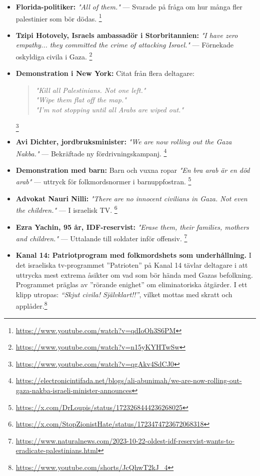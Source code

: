 \documentclass[12pt]{article}
\begin{document}
\begin{itemize}
    \item \textbf{Florida-politiker:} \textit{"All of them."} — Svarade på fråga om hur många fler palestinier som bör dödas. \footnote{\url{https://www.youtube.com/watch?v=qdIoOh3S6PM}}

    \item \textbf{Tzipi Hotovely, Israels ambassadör i Storbritannien:} \textit{"I have zero empathy... they committed the crime of attacking Israel."} — Förnekade oskyldiga civila i Gaza. \footnote{\url{https://www.youtube.com/watch?v=n15yKYHTwSw}}

    \item \textbf{Demonstration i New York:} Citat från flera deltagare:
    \begin{quote}
    \textit{"Kill all Palestinians. Not one left."}\\
    \textit{"Wipe them flat off the map."}\\
    \textit{"I’m not stopping until all Arabs are wiped out."}
    \end{quote}
    \footnote{\url{https://www.youtube.com/watch?v=qgAkv4SdCJ0}}

    \item \textbf{Avi Dichter, jordbruksminister:} \textit{"We are now rolling out the Gaza Nakba."} — Bekräftade ny fördrivningskampanj. \footnote{\url{https://electronicintifada.net/blogs/ali-abunimah/we-are-now-rolling-out-gaza-nakba-israeli-minister-announces}}

    \item \textbf{Demonstration med barn:} Barn och vuxna ropar \textit{"En bra arab är en död arab"} — uttryck för folkmordsnormer i barnuppfostran. \footnote{\url{https://x.com/DrLoupis/status/1723268444236268025}}

    \item \textbf{Advokat Nauri Nilli:} \textit{"There are no innocent civilians in Gaza. Not even the children."} — I israelisk TV. \footnote{\url{https://x.com/StopZionistHate/status/1723474723672068318}}

    \item \textbf{Ezra Yachin, 95 år, IDF-reservist:} \textit{"Erase them, their families, mothers and children."} — Uttalande till soldater inför offensiv. \footnote{\url{https://www.naturalnews.com/2023-10-22-oldest-idf-reservist-wants-to-eradicate-palestinians.html}}

\item \textbf{Kanal 14: Patriotprogram med folkmordshets som underhållning.} I det israeliska tv-programmet ”Patrioten” på Kanal 14 tävlar deltagare i att uttrycka mest extrema åsikter om vad som bör hända med Gazas befolkning. Programmet präglas av ”rörande enighet” om eliminatoriska åtgärder. I ett klipp utropas: \textit{“Skjut civila! Självklart!!”}, vilket mottas med skratt och applåder.\footnote{\url{https://www.youtube.com/shorts/JcQhwT2kJ_4}}


\end{itemize}
\end{document}
